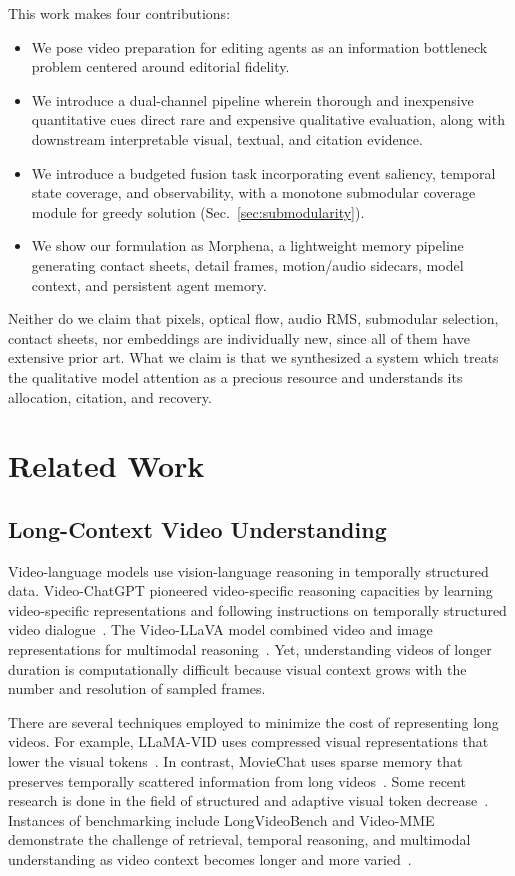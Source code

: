 \documentclass[conference]{IEEEtran}
\begin{document}
This work makes four contributions:

\begin{itemize}
    \item We pose video preparation for editing agents as an information bottleneck problem centered around editorial fidelity.
    \item We introduce a dual-channel pipeline wherein thorough and inexpensive quantitative cues direct rare and expensive qualitative evaluation, along with downstream interpretable visual, textual, and citation evidence.
    \item We introduce a budgeted fusion task incorporating event saliency, temporal state coverage, and observability, with a monotone submodular coverage module for greedy solution (Sec.~\ref{sec:submodularity}).
    \item We show our formulation as Morphena, a lightweight memory pipeline generating contact sheets, detail frames, motion/audio sidecars, model context, and persistent agent memory.
\end{itemize}

Neither do we claim that pixels, optical flow, audio RMS, submodular selection, contact sheets, nor embeddings are individually new, since all of them have extensive prior art. What we claim is that we synthesized a system which treats the qualitative model attention as a precious resource and understands its allocation, citation, and recovery.


\section{Related Work}

\subsection{Long-Context Video Understanding}

Video-language models use vision-language reasoning in temporally structured data. Video-ChatGPT pioneered video-specific reasoning capacities by learning video-specific representations and following instructions on temporally structured video dialogue~\cite{maaz2024videochatgpt}. The Video-LLaVA model combined video and image representations for multimodal reasoning~\cite{lin2024videollava}. Yet, understanding videos of longer duration is computationally difficult because visual context grows with the number and resolution of sampled frames.

There are several techniques employed to minimize the cost of representing long videos. For example, LLaMA-VID uses compressed visual representations that lower the visual tokens~\cite{li2023llamavid}. In contrast, MovieChat uses sparse memory that preserves temporally scattered information from long videos~\cite{song2024moviechat}. Some recent research is done in the field of structured and adaptive visual token decrease~\cite{ju2026forestprune,xu2026score}. Instances of benchmarking include LongVideoBench and Video-MME demonstrate the challenge of retrieval, temporal reasoning, and multimodal understanding as video context becomes longer and more varied~\cite{wu2024longvideobench,fu2025videomme}.
\end{document}
